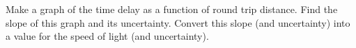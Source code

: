 \documentclass[11pt]{article}
\begin{document}
\vspace{5mm}


Make a graph of the time delay as a function of round trip distance. Find the
slope of this graph and its uncertainty. Convert this slope (and uncertainty)
into a value for the speed of light (and uncertainty).


% 



\end{document}
